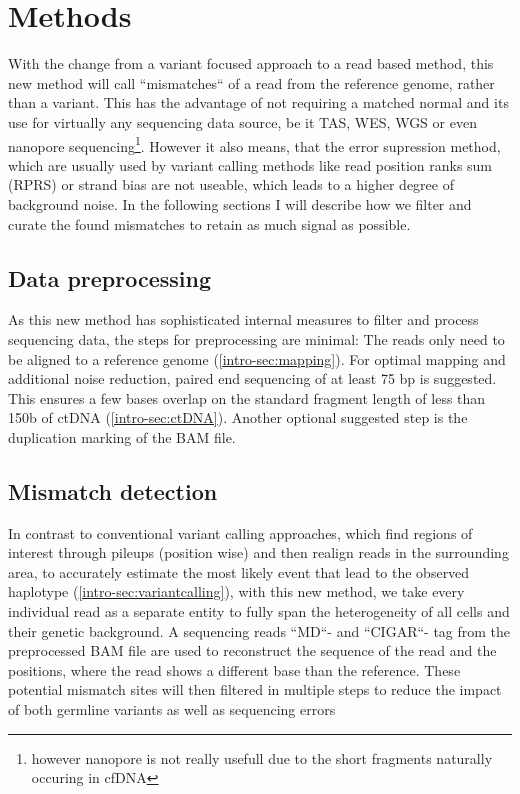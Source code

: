 \section{Methods}
\label{mmf-sec:methods}

With the change from a variant focused approach to a read based method, this new method will call ``mismatches`` of a read from the reference genome, rather than a variant. This has the advantage of not requiring a matched normal and its use for virtually any sequencing data source, be it TAS, WES, WGS or even nanopore sequencing\footnote{however nanopore is not really usefull due to the short fragments naturally occuring in cfDNA}. However it also means, that the error supression method, which are usually used by variant calling methods like read position ranks sum (RPRS) or strand bias are not useable, which leads to a higher degree of background noise. In the following sections I will describe how we filter and curate the found mismatches to retain as much signal as possible.

\subsection{Data preprocessing}
As this new method has sophisticated internal measures to filter and process sequencing data, the steps for preprocessing are minimal: The reads only need to be aligned to a reference genome (\autoref{intro-sec:mapping}). For optimal mapping and additional noise reduction, paired end sequencing of at least 75 bp is suggested. This ensures a few bases overlap on the standard fragment length of less than 150b of ctDNA (\autoref{intro-sec:ctDNA}). Another optional suggested step is the duplication marking of the BAM file.

\subsection{Mismatch detection}
In contrast to conventional variant calling approaches, which find regions of interest through pileups (position wise) and then realign reads in the surrounding area, to accurately estimate the most likely event that lead to the observed haplotype (\autoref{intro-sec:variantcalling}), with this new method, we take every individual read as a separate entity to fully span the heterogeneity of all cells and their genetic background. A sequencing reads ``MD``- and ``CIGAR``- tag from the preprocessed BAM file are used to reconstruct the sequence of the read and the positions, where the read shows a different base than the reference. These potential mismatch sites will then filtered in multiple steps to reduce the impact of both germline variants as well as sequencing errors

